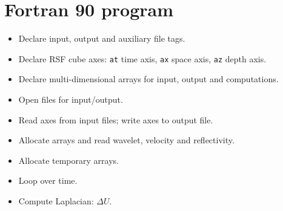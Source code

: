 \section{Fortran 90 program}
\lstset{language=fortran,numbers=left,numberstyle=\tiny,showstringspaces=false}

\tiny

\normalsize
\newpage

\begin{itemize}
\item Declare input, output and auxiliary file tags.
\tiny

\normalsize

\item Declare RSF cube axes:
\texttt{at} time axis,
\texttt{ax} space axis,
\texttt{az} depth axis.
\tiny

\normalsize

\item Declare multi-dimensional arrays for input, output and computations.
\tiny

\normalsize

\item Open files for input/output.
\tiny

\normalsize

\item Read axes from input files; write axes to output file.
\tiny

\normalsize

\item Allocate arrays and read wavelet, velocity and reflectivity.
\tiny

\normalsize

\item Allocate temporary arrays.
\tiny

\normalsize

\item Loop over time.
\tiny

\normalsize

\item Compute Laplacian: $\Delta U$.
\tiny

\normalsize


\end{itemize}
